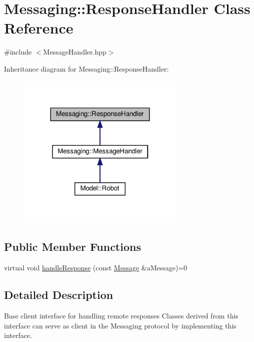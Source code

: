 \hypertarget{class_messaging_1_1_response_handler}{}\section{Messaging\+:\+:Response\+Handler Class Reference}
\label{class_messaging_1_1_response_handler}


{\ttfamily \#include $<$Message\+Handler.\+hpp$>$}



Inheritance diagram for Messaging\+:\+:Response\+Handler\+:
\nopagebreak
\begin{figure}[H]
\begin{center}
\leavevmode
\includegraphics[width=228pt]{class_messaging_1_1_response_handler__inherit__graph}
\end{center}
\end{figure}
\subsection*{Public Member Functions}
\begin{DoxyCompactItemize}
\item 
virtual void \hyperlink{class_messaging_1_1_response_handler_a13c456a994ef15b4f7be7beed4e2f91f}{handle\+Response} (const \hyperlink{struct_messaging_1_1_message}{Message} \&a\+Message)=0
\end{DoxyCompactItemize}


\subsection{Detailed Description}
Base client interface for handling remote responses Classes derived from this interface can serve as client in the Messaging protocol by implementing this interface. 

